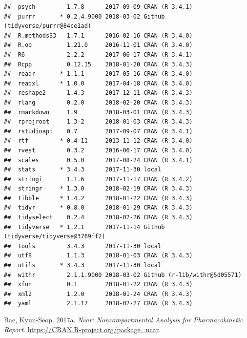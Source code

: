 \documentclass[12pt,]{krantz}
\theoremstyle{definition}
\theoremstyle{definition}
\theoremstyle{definition}
\theoremstyle{remark}
\begin{document}
\begin{verbatim}
##  psych         1.7.8      2017-09-09 CRAN (R 3.4.1)                      
##  purrr       * 0.2.4.9000 2018-03-02 Github (tidyverse/purrr@84ce1ad)    
##  R.methodsS3   1.7.1      2016-02-16 CRAN (R 3.4.0)                      
##  R.oo          1.21.0     2016-11-01 CRAN (R 3.4.0)                      
##  R6            2.2.2      2017-06-17 CRAN (R 3.4.1)                      
##  Rcpp          0.12.15    2018-01-20 CRAN (R 3.4.3)                      
##  readr       * 1.1.1      2017-05-16 CRAN (R 3.4.0)                      
##  readxl      * 1.0.0      2017-04-18 CRAN (R 3.4.0)                      
##  reshape2      1.4.3      2017-12-11 CRAN (R 3.4.3)                      
##  rlang         0.2.0      2018-02-20 CRAN (R 3.4.3)                      
##  rmarkdown     1.9        2018-03-01 CRAN (R 3.4.3)                      
##  rprojroot     1.3-2      2018-01-03 CRAN (R 3.4.3)                      
##  rstudioapi    0.7        2017-09-07 CRAN (R 3.4.1)                      
##  rtf         * 0.4-11     2013-11-12 CRAN (R 3.4.0)                      
##  rvest         0.3.2      2016-06-17 CRAN (R 3.4.0)                      
##  scales        0.5.0      2017-08-24 CRAN (R 3.4.1)                      
##  stats       * 3.4.3      2017-11-30 local                               
##  stringi       1.1.6      2017-11-17 CRAN (R 3.4.2)                      
##  stringr     * 1.3.0      2018-02-19 CRAN (R 3.4.3)                      
##  tibble      * 1.4.2      2018-01-22 CRAN (R 3.4.3)                      
##  tidyr       * 0.8.0      2018-01-29 CRAN (R 3.4.3)                      
##  tidyselect    0.2.4      2018-02-26 CRAN (R 3.4.3)                      
##  tidyverse   * 1.2.1      2017-11-14 Github (tidyverse/tidyverse@3769ff2)
##  tools         3.4.3      2017-11-30 local                               
##  utf8          1.1.3      2018-01-03 CRAN (R 3.4.3)                      
##  utils       * 3.4.3      2017-11-30 local                               
##  withr         2.1.1.9000 2018-03-02 Github (r-lib/withr@5d05571)        
##  xfun          0.1        2018-01-22 CRAN (R 3.4.3)                      
##  xml2          1.2.0      2018-01-24 CRAN (R 3.4.3)                      
##  yaml          2.1.17     2018-02-27 CRAN (R 3.4.3)
\end{verbatim}

\hypertarget{refs}{}
\hypertarget{ref-R-ncar}{}
Bae, Kyun-Seop. 2017a. \emph{Ncar: Noncompartmental Analysis for
Pharmacokinetic Report}. \url{https://CRAN.R-project.org/package=ncar}.
\end{document}
